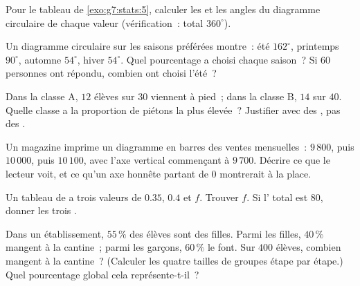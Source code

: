 \begin{exercise}[$\star$]\label{exo:g7:stats:6}
Pour le tableau de \cref{exo:g7:stats:5}, calculer les  et
les angles du diagramme circulaire de chaque valeur (vérification~:
total $360^\circ$).
\end{exercise}

\begin{exercise}[$\star$]\label{exo:g7:stats:7}
Un diagramme circulaire sur les saisons préférées montre~: été
$162^\circ$, printemps $90^\circ$, automne $54^\circ$, hiver
$54^\circ$. Quel pourcentage a choisi chaque saison~? Si $60$
personnes ont répondu, combien ont choisi l'été~?
\end{exercise}

\begin{exercise}[$\star\star$]\label{exo:g7:stats:8}
Dans la classe A, $12$ élèves sur $30$ viennent à pied~; dans la
classe B, $14$ sur $40$. Quelle classe a la proportion de piétons la
plus élevée~? Justifier avec des , pas des .
\end{exercise}

\begin{exercise}[$\star\star$]\label{exo:g7:stats:9}
Un magazine imprime un diagramme en barres des ventes mensuelles~:
$9\,800$, puis $10\,000$, puis $10\,100$, avec l'axe vertical
commençant à $9\,700$. Décrire ce que le lecteur voit, et ce qu'un
axe honnête partant de $0$ montrerait à la place.
\end{exercise}

\begin{exercise}[$\star\star$]\label{exo:g7:stats:10}
Un tableau de  a trois valeurs de  $0.35$, $0.4$
et $f$. Trouver $f$. Si l' total est $80$, donner les trois
.
\end{exercise}

\begin{exercise}[$\star\star\star$]\label{exo:g7:stats:11}
Dans un établissement, $55\,\%$ des élèves sont des filles. Parmi les
filles, $40\,\%$ mangent à la cantine~; parmi les garçons, $60\,\%$
le font. Sur $400$ élèves, combien mangent à la cantine~? (Calculer
les quatre tailles de groupes étape par étape.) Quel pourcentage
global cela représente-t-il~?
\end{exercise}

